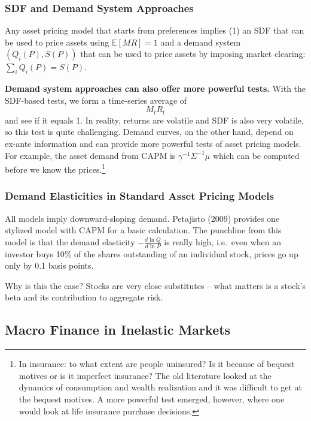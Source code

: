 \documentclass[
]{book}
\begin{document}
\hypertarget{sdf-and-demand-system-approaches}{%
\subsubsection{SDF and Demand System Approaches}\label{sdf-and-demand-system-approaches}}

Any asset pricing model that starts from preferences implies (1) an SDF that can be used to price assets using \(\mathbb{E}[MR]=1\) and a demand system \((Q_i(P),S(P))\) that can be used to price assets by imposing market clearing: \(\sum_i Q_i(P) = S(P)\).

\textbf{Demand system approaches can also offer more powerful tests.} With the SDF-based tests, we form a time-series average of \[M_t R_t\] and see if it equals 1. In reality, returns are volatile and SDF is also very volatile, so this test is quite challenging. Demand curves, on the other hand, depend on ex-ante information and can provide more powerful tests of asset pricing models. For example, the asset demand from CAPM is \(\gamma^{-1} \Sigma^{-1} \mu\) which can be computed before we know the prices.\footnote{In insurance: to what extent are people uninsured? Is it because of bequest motives or is it imperfect insurance? The old literature looked at the dynamics of consumption and wealth realization and it was difficult to get at the bequest motives. A more powerful test emerged, however, where one would look at life insurance purchase decisions.}

\hypertarget{demand-elasticities-in-standard-asset-pricing-models}{%
\subsubsection{Demand Elasticities in Standard Asset Pricing Models}\label{demand-elasticities-in-standard-asset-pricing-models}}

All models imply downward-sloping demand. Petajisto (2009) provides one stylized model with CAPM for a basic calculation. The punchline from this model is that the demand elasticity \(-\frac{d\ln Q}{d\ln P}\) is really high, i.e.~even when an investor buys 10\% of the shares outstanding of an individual stock, prices go up only by 0.1 basis points.

Why is this the case? Stocks are very close substitutes -- what matters is a stock's beta and its contribution to aggregate risk.

\hypertarget{macro-finance-in-inelastic-markets}{%
\subsection{Macro Finance in Inelastic Markets}\label{macro-finance-in-inelastic-markets}}
\end{document}
